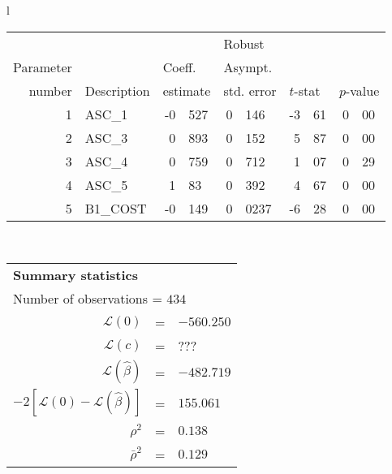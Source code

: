   \begin{tabular}{l}
\begin{tabular}{rlr@{.}lr@{.}lr@{.}lr@{.}l}
         &                       &   \multicolumn{2}{l}{}    & \multicolumn{2}{l}{Robust}  &     \multicolumn{4}{l}{}   \\
Parameter &                       &   \multicolumn{2}{l}{Coeff.}      & \multicolumn{2}{l}{Asympt.}  &     \multicolumn{4}{l}{}   \\
number &  Description                     &   \multicolumn{2}{l}{estimate}      & \multicolumn{2}{l}{std. error}  &   \multicolumn{2}{l}{$t$-stat}  &   \multicolumn{2}{l}{$p$-value}   \\

\hline

1 & ASC\_1 & -0&527 & 0&146 & -3&61 & 0&00 \\
2 & ASC\_3 & 0&893 & 0&152 & 5&87 & 0&00 \\
3 & ASC\_4 & 0&759 & 0&712 & 1&07 & 0&29 \\
4 & ASC\_5 & 1&83 & 0&392 & 4&67 & 0&00 \\
5 & B1\_COST & -0&149 & 0&0237 & -6&28 & 0&00 \\
\hline

\end{tabular}
\\
\begin{tabular}{rcl}
\multicolumn{3}{l}{\bf Summary statistics}\\
\multicolumn{3}{l}{ Number of observations = $434$} \\
 $\mathcal{L}(0)$ &=&  $-560.250$ \\
 $\mathcal{L}(c)$ &=& ???\\
 $\mathcal{L}(\hat{\beta})$ &=& $-482.719 $  \\
 $-2[\mathcal{L}(0) -\mathcal{L}(\hat{\beta})]$ &=& $155.061$ \\
    $\rho^2$ &=&   $0.138$ \\
    $\bar{\rho}^2$ &=&    $0.129$ \\
\end{tabular}
\end{tabular}


